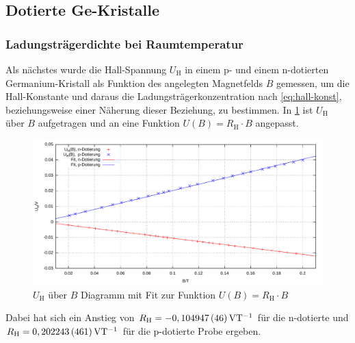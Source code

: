 \documentclass[numbers=noenddot,12pt,a4paper]{scrartcl}
\newcommand{\ix}[1]{_\text{#1}}
\begin{document}
\subsection{Dotierte Ge-Kristalle}
\subsubsection{Ladungsträgerdichte bei Raumtemperatur}
Als nächstes wurde die Hall-Spannung $U\ix{H}$ in einem p- und einem n-dotierten Germanium-Kristall als Funktion des angelegten Magnetfelds $B$ gemessen, um die Hall-Konstante und daraus die Ladungsträgerkonzentration nach \ref{eq:hall-konst}, beziehungsweise einer Näherung dieser Beziehung, zu bestimmen. In \ref{img:hall-konst} ist $U\ix{H}$ über $B$ aufgetragen und an eine Funktion $U(B)=R\ix{H}\cdot B$ angepasst.
\begin{figure}[H]
	\includegraphics[width=\textwidth]{messwerte/hallkonstanten.pdf}
	\caption{$U\ix{H}$ über $B$ Diagramm mit Fit zur Funktion $U(B)=R\ix{H}\cdot B$} \label{img:hall-konst}
\end{figure}
Dabei hat sich ein Anstieg von $R\ix{H}=\unit[-0,104947\,(46)]{VT^{-1}}$ für die n-dotierte und $R\ix{H}=\unit[0,202243\,(461)]{VT^{-1}}$ für die p-dotierte Probe ergeben.
\end{document}
